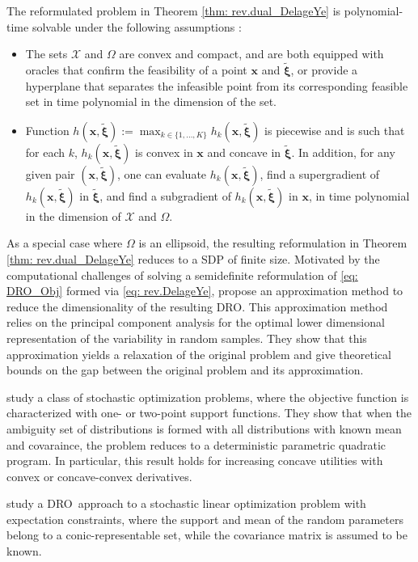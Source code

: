 \documentclass[final,onefignum,onetabnum]{class}
\newcommand{\bs}[1]{\boldsymbol{#1}} %
\newcommand{\Cs}[1]{\mathcal{#1}} %
\newcommand{\txi}{\tilde{\bs{\xi}}}
\newcommand{\dro}{DRO}
\begin{document}
The reformulated problem in Theorem \ref{thm: rev.dual_DelageYe} is  polynomial-time solvable under the following assumptions \citep{delage2010}:
\begin{itemize}
	\item The sets $\Cs{X}$ and $\Omega$ are convex and compact, and are both equipped with oracles that confirm the feasibility of a point $\bs{x}$ and $\txi$, or provide  a hyperplane that separates the infeasible point from its corresponding feasible set in time polynomial in the dimension of the set. 
	\item Function $h(\bs{x},\txi):=\max_{k \in \{1,\ldots, K\}} h_{k}(\bs{x},\txi)$ is piecewise and is such that for each $k$,  $h_{k}(\bs{x},\txi)$ is convex in $\bs{x}$ and concave in $\txi$. In addition, for any given pair $(\bs{x},\txi)$, one can evaluate $h_{k}(\bs{x},\txi)$, find a supergradient of $h_{k}(\bs{x},\txi)$ in $\txi$, and find a subgradient of $h_{k}(\bs{x},\txi)$ in $\bs{x}$, in time polynomial in the dimension  of  $\Cs{X}$ and $\Omega$. 
\end{itemize}
As a special case where $\Omega$ is an ellipsoid,  the resulting reformulation in Theorem \ref{thm: rev.dual_DelageYe} reduces to a SDP of finite size. Motivated by the computational challenges of solving a semidefinite reformulation of \eqref{eq: DRO_Obj} formed via \eqref{eq: rev.DelageYe}, \citet{cheng2018}  propose an approximation method  to reduce the dimensionality of the resulting \dro. This approximation method relies on the principal component analysis  for the optimal lower
dimensional representation of the variability in random samples. They show that this approximation yields a relaxation of the original problem and  give theoretical bounds on the gap between the
original problem and its approximation. 

\citet{popescu2007} study a class of stochastic optimization problems, where the objective function is characterized with one- or two-point support functions. They show that when the ambiguity set of distributions is formed with all distributions with known mean and covaraince, the problem reduces to a deterministic parametric quadratic program. In particular, this result holds for increasing concave utilities with convex or concave-convex derivatives. 


\citet{goh2010tractable} study a \dro\ approach to a  stochastic linear optimization problem with expectation constraints, where the support and mean of the random parameters belong to a conic-representable set, while the covariance matrix is assumed to be known.
\end{document}
